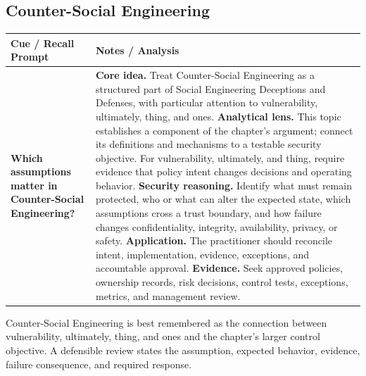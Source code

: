 \documentclass[11pt]{article}
\newcommand{\CornellHeader}{%
\rowcolor{Navy}\color{white}\bfseries Cue / Recall Prompt & \color{white}\bfseries Notes / Analysis\\\hline}
\newcommand{\CornellRow}[2]{%
\cellcolor{CueGray}\RaggedRight\textbf{#1} & \RaggedRight #2\\\hline}
\begin{document}
\subsection*{Counter-Social Engineering}
\begin{longtable}{>{\RaggedRight\arraybackslash}p{}|>{\RaggedRight\arraybackslash}p{}}
\CornellHeader
\CornellRow{Which assumptions matter in Counter-Social Engineering?}{\textbf{Core idea.} Treat Counter-Social Engineering as a structured part of Social Engineering Deceptions and Defenses, with particular attention to vulnerability, ultimately, thing, and ones. \textbf{Analytical lens.} This topic establishes a component of the chapter's argument; connect its definitions and mechanisms to a testable security objective. For vulnerability, ultimately, and thing, require evidence that policy intent changes decisions and operating behavior. \textbf{Security reasoning.} Identify what must remain protected, who or what can alter the expected state, which assumptions cross a trust boundary, and how failure changes confidentiality, integrity, availability, privacy, or safety. \textbf{Application.} The practitioner should reconcile intent, implementation, evidence, exceptions, and accountable approval. \textbf{Evidence.} Seek approved policies, ownership records, risk decisions, control tests, exceptions, metrics, and management review.}
\end{longtable}
\begin{topicsummary}
Counter-Social Engineering is best remembered as the connection between vulnerability, ultimately, thing, and ones and the chapter's larger control objective. A defensible review states the assumption, expected behavior, evidence, failure consequence, and required response.
\end{topicsummary}
\end{document}
